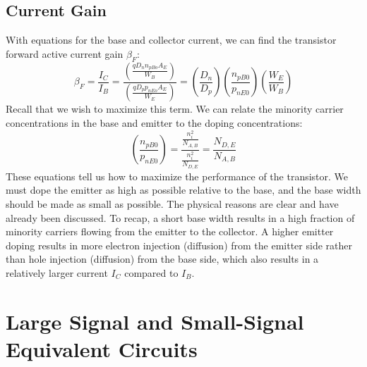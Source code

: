 \subsection{Current Gain}
With equations for the base and collector current, we can find the transistor forward active current gain $\beta_F$:
\begin{equation}
	{\beta _F} = \frac{{{I_C}}}{{{I_B}}} = \frac{{\left( {\frac{{q{D_n}{n_{pBo}}{A_E}}}{{{W_B}}}} \right)}}{{\left( {\frac{{q{D_p}{p_{nEo}}{A_E}}}{{{W_E}}}} \right)}} = \left( {\frac{{{D_n}}}{{{D_p}}}} \right)\left( {\frac{{{n_{pB0}}}}{{{p_{nE0}}}}} \right)\left( {\frac{{{W_E}}}{{{W_B}}}} \right)
\end{equation}
Recall that we wish to maximize this term.  We can relate the minority carrier concentrations in the base and emitter to the doping concentrations:
\begin{equation}
	\left( {\frac{{{n_{pB0}}}}{{{p_{nE0}}}}} \right) = \frac{{\frac{{n_i^2}}{{{N_{A,B}}}}}}{{\frac{{n_i^2}}	{{{N_{D,E}}}}}} = \frac{{{N_{D,E}}}}{{{N_{A,B}}}}
\end{equation}
These equations tell us how to maximize the performance of the transistor.  We must dope the emitter as high as possible relative to the base, and the base width should be made as small as possible.  The physical reasons are clear and have already been discussed.  To recap, a short base width results in a high fraction of minority carriers flowing from the emitter to the collector.  A higher emitter doping results in more electron injection (diffusion) from the emitter side rather than hole injection (diffusion) from the base side, which also results in a relatively larger current $I_C$ compared to $I_B$.
\section{Large Signal and Small-Signal Equivalent Circuits}
